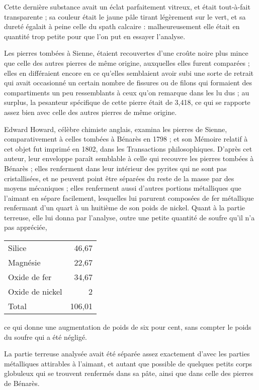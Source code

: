 \documentclass[a4paper, 12pt, oneside, french]{article}
\begin{document}
Cette dernière substance avait un éclat parfaitement vitreux, et était tout-à-fait transparente ; sa couleur était le jaune pâle tirant légèrement sur le vert, et sa dureté égalait à peine celle du spath calcaire : malheureusement elle était en quantité trop petite pour que l'on put en essayer l'analyse.

Les pierres tombées à Sienne, étaient recouvertes d'une croûte noire plus mince que celle des autres pierres de même origine, auxquelles elles furent comparées ; elles en différaient encore en ce qu'elles semblaient avoir subi une sorte de retrait qui avait occasionné un certain nombre de fissures ou de filons qui formaient des compartiments un peu ressemblants à ceux qu'on remarque dans les lu dus ; au surplus, la pesanteur spécifique de cette pierre était de 3,418, ce qui se rapporte assez bien avec celle des autres pierres de même origine.

Edward Howard, célèbre chimiste anglais, examina les pierres de Sienne, comparativement à celles tombées à Bénarès en 1798 ; et son Mémoire relatif à cet objet fut imprimé en 1802, dans les Transactions philosophiques. D'après cet auteur, leur enveloppe paraît semblable à celle qui recouvre les pierres tombées à Bénarès ; elles renferment dans leur intérieur des pyrites qui ne sont pas cristallisées, et ne peuvent point être séparées du reste de la masse par des moyens mécaniques ; elles renferment aussi d'autres portions métalliques que l'aimant en sépare facilement, lesquelles lui parurent composées de fer métallique renfermant d'un quart à un huitième de son poids de nickel. Quant à la partie terreuse, elle lui donna par l'analyse, outre une petite quantité de soufre qu'il n'a pas appréciée,
\begin{table}[H]
    \centering
    \begin{tabular}{l r}
        Silice & 46,67 \\
        Magnésie & 22,67 \\
        Oxide de fer & 34,67 \\
        Oxide de nickel & 2 \\ \hline
        Total & 106,01 \\
    \end{tabular}
\end{table}
ce qui donne une augmentation de poids de six pour cent, sans compter le poids du soufre qui a été négligé.

La partie terreuse analysée avait été séparée assez exactement d'avec les parties métalliques attirables à l'aimant, et autant que possible de quelques petits corps globuleux qui se trouvent renfermés dans sa pâte, ainsi que dans celle des pierres de Bénarès.
\end{document}

